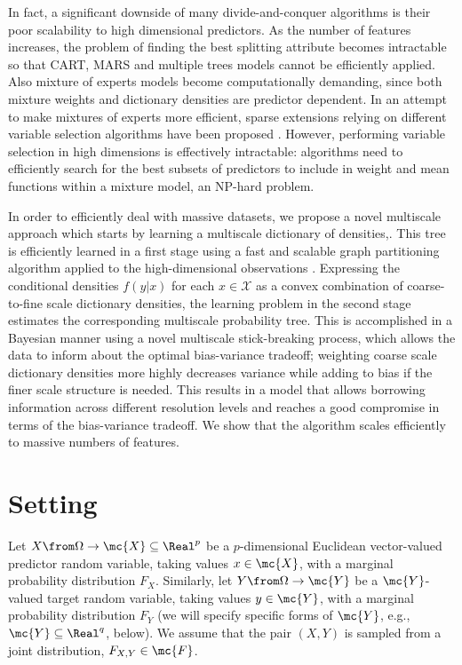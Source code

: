 In fact, a significant downside of many divide-and-conquer algorithms is their poor scalability to high dimensional predictors. As the number of features increases, the problem of finding the best splitting attribute becomes intractable so that CART, MARS and multiple trees models cannot be efficiently applied. Also mixture of experts models become computationally demanding, since both mixture weights and dictionary densities are predictor dependent. In an attempt to make mixtures of experts more efficient, sparse extensions relying on different variable selection algorithms have been proposed \cite{SparseMoF}. However, performing variable selection in high dimensions is effectively intractable: algorithms need to efficiently search for the best subsets of predictors to include in weight and mean functions within a mixture model, an NP-hard problem.

 In order to efficiently deal with massive datasets, we propose a novel multiscale approach which starts by learning a multiscale dictionary of densities,. This tree is efficiently learned in a first stage using a fast and scalable graph partitioning algorithm applied to the high-dimensional observations \cite{metis}.  Expressing the conditional densities $f(y|x)$ for each $x \in \mathcal{X}$ as a convex combination of coarse-to-fine scale dictionary densities, the learning problem in the second stage estimates the corresponding multiscale probability tree.  This is accomplished in a Bayesian manner using a novel multiscale stick-breaking process, which allows the data to inform about the optimal bias-variance tradeoff; weighting coarse scale dictionary densities more highly decreases variance while adding to bias if the finer scale structure is needed.  This results in a model that allows borrowing information across different resolution levels and reaches a good compromise in terms of the bias-variance tradeoff. We show that the algorithm scales efficiently to massive numbers of features. 


\section{Setting} \label{sec:setting}
Let $X \from \Omega \to \mc{X} \subseteq \Real^p$ be a 
$p$-dimensional Euclidean vector-valued predictor random variable, taking values $x \in \mc{X}$, with a marginal probability distribution $F_X$.  
Similarly, let $Y \from \Omega \to \mc{Y}$ 
be a $\mc{Y}$-valued target random variable, taking values $y \in \mc{Y}$, with a marginal probability distribution $F_Y$ (we will specify specific forms of $\mc{Y}$, e.g., $\mc{Y} \subseteq \Real^q$, below).  We assume that the pair $(X,Y)$ is sampled from a joint distribution, $F_{X,Y} \in \mc{F}$.

